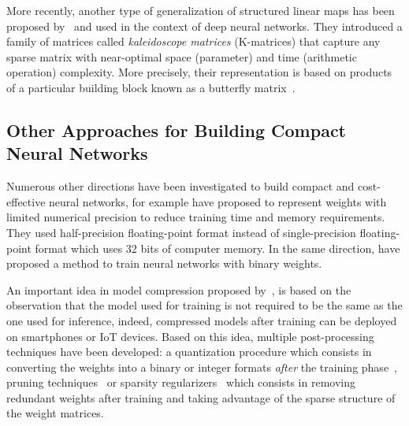 \drawstar

More recently, another type of generalization of structured linear maps has been proposed by~\citet{dao2020kaleidoscope} and used in the context of deep neural networks.
They introduced a family of matrices called \emph{kaleidoscope matrices} (K-matrices) that capture any sparse matrix with near-optimal space (parameter) and time (arithmetic operation) complexity.
More precisely, their representation is based on products of a particular building block known as a butterfly matrix~\cite{parker1995random,dao2019learning}.





\subsection{Other Approaches for Building Compact Neural Networks}
\label{subsection:ch3-other_approaches_for_building_compact_neural_networks}


Numerous other directions have been investigated to build compact and cost-effective neural networks, for example \citet{gupta2015deep,micikevicius2018mixed} have proposed to represent weights with limited numerical precision to reduce training time and memory requirements.
They used half-precision floating-point format instead of single-precision floating-point format which uses 32 bits of computer memory.
In the same direction, \citet{courbariaux2015binaryconnect} have proposed a method to train neural networks with binary weights.

An important idea in model compression proposed by~\citet{bucilua2006model}, is based on the observation that the model used for training is not required to be the same as the one used for inference, indeed, compressed models after training can be deployed on smartphones or IoT devices.
Based on this idea, multiple post-processing techniques have been developed: a quantization procedure which consists in converting the weights into a binary or integer formats \emph{after} the training phase~\cite{mellempudi2017ternary,rastegariECCV16}, pruning techniques~\cite{dai2018compressing,han2015deep,lin2017runtime} or sparsity regularizers~\cite{collins2014memory,dai2018compressing,liu2015sparse} which consists in removing redundant weights after training and taking advantage of the sparse structure of the weight matrices.

